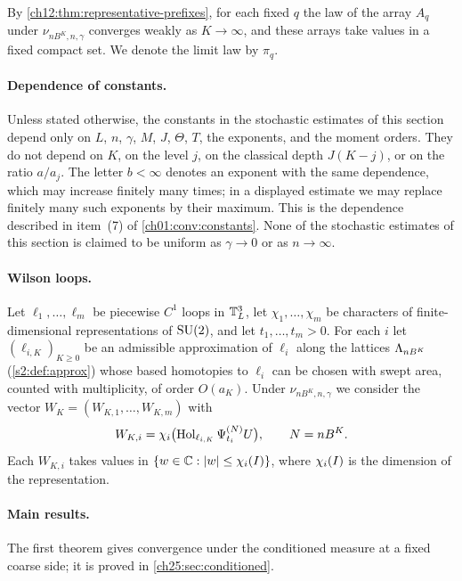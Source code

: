 By \cref{ch12:thm:representative-prefixes}, for each fixed $q$ the law of the array $A_q$ under $\nu_{nB^K,n,\gamma}$ converges weakly as $K\to\infty$, and these arrays take values in a fixed compact set. We denote the limit law by $\pi_q$.

\paragraph{Dependence of constants.}
Unless stated otherwise, the constants in the stochastic estimates of this section depend only on $L$, $n$, $\gamma$, $M$, $J$, $\Theta$, $T$, the exponents, and the moment orders. They do not depend on $K$, on the level $j$, on the classical depth $J(K-j)$, or on the ratio $a/a_j$. The letter $b<\infty$ denotes an exponent with the same dependence, which may increase finitely many times; in a displayed estimate we may replace finitely many such exponents by their maximum. This is the dependence described in item~(7) of \cref{ch01:conv:constants}. None of the stochastic estimates of this section is claimed to be uniform as $\gamma\to0$ or as $n\to\infty$.

\paragraph{Wilson loops.}
Let $\ell_1,\ldots,\ell_m$ be piecewise $C^1$ loops in $\mathbb T_L^3$, let $\chi_1,\ldots,\chi_m$ be characters of finite-dimensional representations of $\mathrm{SU}(2)$, and let $t_1,\ldots,t_m>0$. For each $i$ let $(\ell_{i,K})_{K\ge0}$ be an admissible approximation of $\ell_i$ along the lattices $\Lambda_{nB^K}$ (\cref{s2:def:approx}) whose based homotopies to $\ell_i$ can be chosen with swept area, counted with multiplicity, of order $O(a_K)$. Under $\nu_{nB^K,n,\gamma}$ we consider the vector $W_K=(W_{K,1},\ldots,W_{K,m})$ with
\[
 W_{K,i}=\chi_i\bigl(\operatorname{Hol}_{\ell_{i,K}}\Psi^{(N)}_{t_i}U\bigr),\qquad N=nB^K.
\]
Each $W_{K,i}$ takes values in $\{w\in\mathbb C:\lvert w\rvert\le\chi_i(I)\}$, where $\chi_i(I)$ is the dimension of the representation.

\paragraph{Main results.}
The first theorem gives convergence under the conditioned measure at a fixed coarse side; it is proved in \cref{ch25:sec:conditioned}.

